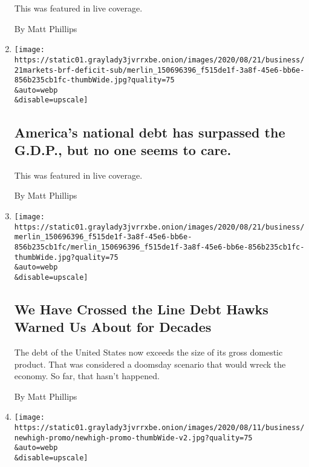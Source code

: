 \begin{enumerate}
  This was featured in live coverage.

  By Matt Phillips
\item
  \href{/live/2020/08/21/business/stock-market-today-coronavirus/americas-national-debt-has-surpassed-the-gdp-but-no-one-seems-to-care}{}

  \texttt{[image: https://static01.graylady3jvrrxbe.onion/images/2020/08/21/business/21markets-brf-deficit-sub/merlin\_150696396\_f515de1f-3a8f-45e6-bb6e-856b235cb1fc-thumbWide.jpg?quality=75\\\&auto=webp\\\&disable=upscale]}

  \hypertarget{americas-national-debt-has-surpassed-the-gdp-but-no-one-seems-to-care}{%
  \subsection{America's national debt has surpassed the G.D.P., but no
  one seems to
  care.}\label{americas-national-debt-has-surpassed-the-gdp-but-no-one-seems-to-care}}

  This was featured in live coverage.

  By Matt Phillips
\item
  \href{/2020/08/21/business/economy/national-debt-coronavirus-stimulus.html}{}

  \texttt{[image: https://static01.graylady3jvrrxbe.onion/images/2020/08/21/business/merlin\_150696396\_f515de1f-3a8f-45e6-bb6e-856b235cb1fc/merlin\_150696396\_f515de1f-3a8f-45e6-bb6e-856b235cb1fc-thumbWide.jpg?quality=75\\\&auto=webp\\\&disable=upscale]}

  \hypertarget{we-have-crossed-the-line-debt-hawks-warned-us-about-for-decades}{%
  \subsection{We Have Crossed the Line Debt Hawks Warned Us About for
  Decades}\label{we-have-crossed-the-line-debt-hawks-warned-us-about-for-decades}}

  The debt of the United States now exceeds the size of its gross
  domestic product. That was considered a doomsday scenario that would
  wreck the economy. So far, that hasn't happened.

  By Matt Phillips
\item
  \href{/2020/08/18/business/stock-market-record.html}{}

  \texttt{[image: https://static01.graylady3jvrrxbe.onion/images/2020/08/11/business/newhigh-promo/newhigh-promo-thumbWide-v2.jpg?quality=75\\\&auto=webp\\\&disable=upscale]}


\end{enumerate}
